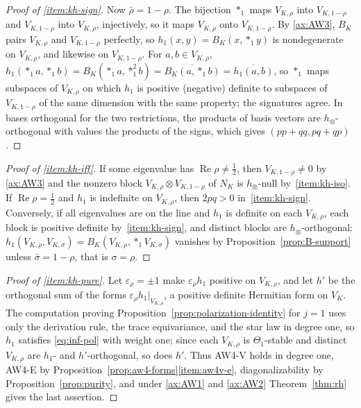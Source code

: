 \documentclass[11pt]{amsart}
\theoremstyle{plain}
\theoremstyle{definition}
\theoremstyle{remark}
\numberwithin{equation}{section}
\DeclareMathOperator{\Rea}{Re}
\renewcommand{\Re}{\Rea}
\begin{document}
\begin{proof}[Proof of \ref{item:kh-sign}]
Now $\bar\rho=1-\rho$. The bijection $*_1$ maps $V_{K,\rho}$ into
$V_{K,1-\rho}$ and $V_{K,1-\rho}$ into $V_{K,\rho}$, injectively, so it
maps $V_{K,\rho}$ onto $V_{K,1-\rho}$. By \ref{ax:AW3}, $B_K$ pairs
$V_{K,\rho}$ and $V_{K,1-\rho}$ perfectly, so $h_1(x,y)=B_K(x,*_1y)$ is
nondegenerate on $V_{K,\rho}$, and likewise on $V_{K,1-\rho}$. For
$a,b\in V_{K,\rho}$, $h_1(*_1a,*_1b)=B_K(*_1a,*_1^2b)=
\overline{B_K(a,*_1b)}=\overline{h_1(a,b)}$, so $*_1$ maps subspaces of
$V_{K,\rho}$ on which $h_1$ is positive (negative) definite to subspaces
of $V_{K,1-\rho}$ of the same dimension with the same property; the
signatures agree. In bases orthogonal for the two restrictions, the
products of basis vectors are $h_\otimes$-orthogonal with values the
products of the signs, which gives $(pp+qq,pq+qp)$.
\end{proof}

\begin{proof}[Proof of \ref{item:kh-iff}]
If some eigenvalue has $\Re\rho\ne\tfrac12$, then $V_{K,1-\rho}\ne0$ by
\ref{ax:AW3} and the nonzero block $V_{K,\rho}\otimes V_{K,1-\rho}$ of
$N_K$ is $h_\otimes$-null by~\ref{item:kh-iso}. If $\Re\rho=\tfrac12$
and $h_1$ is indefinite on $V_{K,\rho}$, then $2pq>0$
in~\ref{item:kh-sign}. Conversely, if all eigenvalues are on the line
and $h_1$ is definite on each $V_{K,\rho}$, each block is positive
definite by~\ref{item:kh-sign}, and distinct blocks are
$h_\otimes$-orthogonal: $h_1(V_{K,\rho},V_{K,\sigma})=
B_K(V_{K,\rho},*_1V_{K,\sigma})$ vanishes by
Proposition~\ref{prop:B-support} unless $\bar\sigma=1-\rho$, that is
$\sigma=\rho$.
\end{proof}

\begin{proof}[Proof of \ref{item:kh-pure}]
Let $\varepsilon_\rho=\pm1$ make $\varepsilon_\rho h_1$ positive on
$V_{K,\rho}$, and let $h'$ be the orthogonal sum of the forms
$\varepsilon_\rho h_1|_{V_{K,\rho}}$, a positive definite Hermitian form
on $V_K$. The computation proving
Proposition~\ref{prop:polarization-identity} for $j=1$ uses only the
derivation rule, the trace equivariance, and the star law in degree one,
so $h_1$ satisfies \eqref{eq:inf-pol} with weight one; since each
$V_{K,\rho}$ is $\Theta_1$-stable and distinct $V_{K,\rho}$ are $h_1$-
and $h'$-orthogonal, so does $h'$. Thus AW4-V holds in degree one,
AW4-E by Proposition~\ref{prop:aw4-forms}\ref{item:aw4v-e},
diagonalizability by Proposition~\ref{prop:purity}, and under
\ref{ax:AW1} and \ref{ax:AW2} Theorem~\ref{thm:rh} gives the last
assertion.
\end{proof}
\end{document}
